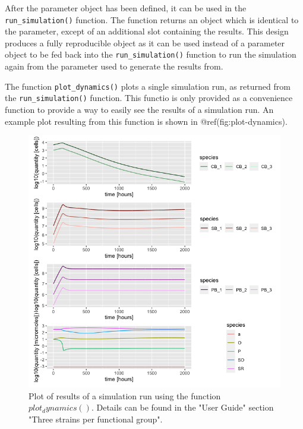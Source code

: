 \documentclass[]{elsarticle} %
\begin{document}
After the parameter object has been defined, it can be used in the
\texttt{run\_simulation()} function. The function returns an object
which is identical to the parameter, except of an additional slot
containing the results. This design produces a fully reproducible object
as it can be used instead of a parameter object to be fed back into the
\texttt{run\_simulation()} function to run the simulation again from the
parameter used to generate the results from.

The function \texttt{plot\_dynamics()} plots a single simulation run, as
returned from the \texttt{run\_simulation()} function. This functio is
only provided as a convenience function to provide a way to easily see
the results of a simulation run. An example plot resulting from this
function is shown in @ref(fig:plot-dynamics).

\begin{figure}

{\centering \includegraphics[width=500px]{figures/ug_three_strains_dynamics} 

}

\caption{Plot of results of a simulation run using the function $plot_dynamics()$. Details can be found in the "User Guide" section "Three strains per functional group".}\label{fig:plot-dynamics}
\end{figure}
\end{document}
